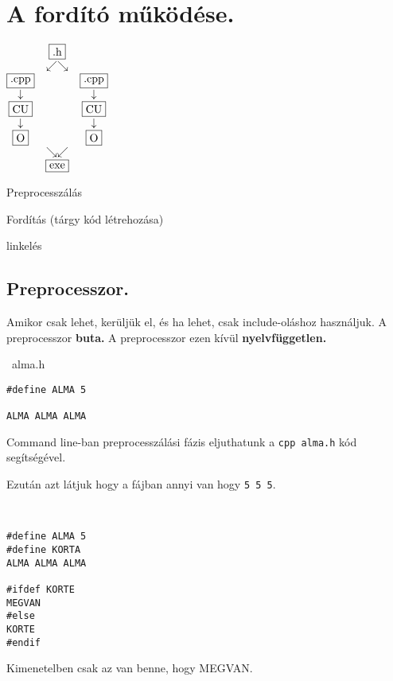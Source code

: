 \documentclass[a4paper,11.5pt]{article}
\begin{document}
	\section{A fordító működése.}
	
	\begin{center}
		$\begin{matrix}
		&\fbox{.h}\\
		&\swarrow\searrow&\\
		\fbox{\text{.cpp}}&&\fbox{.cpp}\\
		\downarrow&&\downarrow\\
		\fbox{CU}&&\fbox{CU}\\
		\downarrow&&\downarrow\\
		\fbox{O}&&\fbox{O}\\
		&\searrow\swarrow&\\
		&\fbox{exe}&
	\end{matrix}$
	\end{center}
	\begin{compactitem}
		\item Preprocesszálás
		\item Fordítás (tárgy kód létrehozása)
		\item linkelés
	\end{compactitem}
	\subsection{Preprocesszor.}
	Amikor csak lehet, kerüljük el, és ha lehet, csak include-oláshoz használjuk. A preprocesszor \textbf{buta.} A preprocesszor ezen kívül \textbf{nyelvfüggetlen.}
	\begin{example}\ 
		alma.h
		\begin{lstlisting}
#define ALMA 5

ALMA ALMA ALMA
		\end{lstlisting}
		Command line-ban preprocesszálási fázis eljuthatunk a \texttt{cpp alma.h} kód segítségével.
		
		Ezután azt látjuk hogy a fájban annyi van hogy \texttt{5 5 5}.
	\end{example}
	\begin{example}\
		
		\begin{lstlisting}
#define ALMA 5
#define KORTA
ALMA ALMA ALMA

#ifdef KORTE
MEGVAN
#else
KORTE
#endif
		\end{lstlisting}
		Kimenetelben csak az van benne, hogy MEGVAN.
	\end{example}
	
\end{document}
